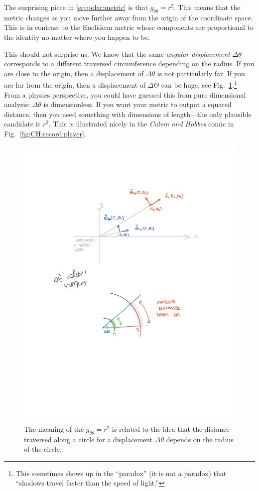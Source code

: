 \documentclass[12pt]{article}
\begin{document}
The surprising piece in \eqref{eq:polar:metric} is that $g_{\theta\theta} = r^2$. This means that the metric changes as you move further away from the origin of the coordinate space. This is in contrast to the Euclidean metric whose components are proportional to the identity no matter where you happen to be.

This should not surprise us. We know that the same \emph{angular displacement} $\Delta \theta$ corresponds to a different traversed circumference depending on the radius. If you are close to the origin, then a displacement of $\Delta\theta$ is not particularly far. If you are far from the origin, then a displacement of $\Delta\Theta$ can be huge, see Fig.~\ref{fig:polar:displacement}.\footnote{This sometimes shows up in the ``paradox'' (it is not a paradox) that ``shadows travel faster than the speed of light.''} From a physics perspective, you could have guessed this from pure dimensional analysis: $\Delta \theta$ is dimensionless. If you want your metric to output a squared distance, then you need something with dimensions of length---the only plausible candidate is $r^2$. This is illustrated nicely in the \emph{Calvin and Hobbes} comic in Fig.~\ref{fig:CH:record:player}.



\begin{figure}[tb]
    \centering
    \includegraphics[width=.4\textwidth]{figures/polar_longer_distance_dtheta.pdf}
    \caption{The meaning of the $g_{\theta\theta} = r^2$ is related to the idea that the distance traversed along a circle for a displacement $\Delta\theta$ depends on the radius of the circle.}
    \label{fig:polar:displacement}
\end{figure}
\end{document}
